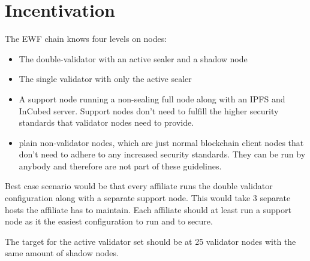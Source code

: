 \section{Incentivation}

The EWF chain knows four levels on nodes:

\begin{itemize}
    \item The double-validator with an active sealer and a shadow node
    \item The single validator with only the active sealer
    \item A support node running a non-sealing full node along with an IPFS and InCubed server. Support nodes don't need to fulfill the higher security standards that validator nodes need to provide.
    \item plain non-validator nodes, which are just normal blockchain client nodes that don't need to adhere to any increased security standards. They can be run by anybody and therefore are not part of these guidelines.
\end{itemize}

Best case scenario would be that every affiliate runs the double validator configuration along with a separate support node. This would take 3 separate hosts the affiliate has to maintain.
Each affiliate should at least run a support node as it the easiest configuration to run and to secure.

The target for the active validator set should be at 25 validator nodes with the same amount of shadow nodes.

